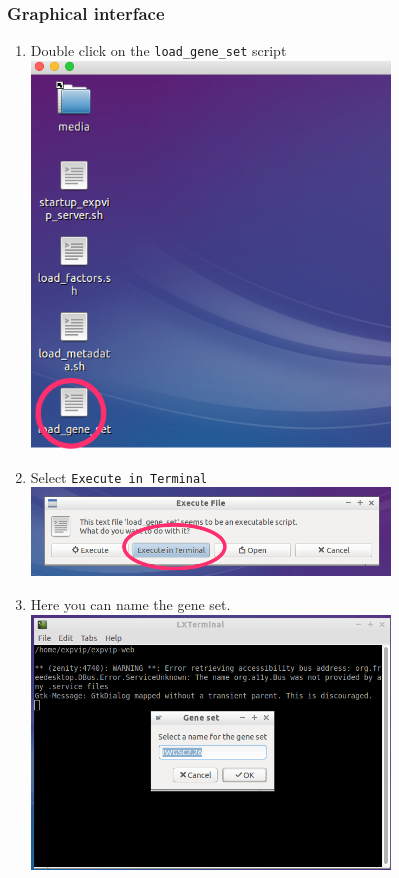 \subsubsection{Graphical interface}\label{graphical-interface}

\begin{enumerate}
\def\labelenumi{\arabic{enumi}.}
\itemsep1pt\parskip0pt
\item
  Double click on the \lstinline!load_gene_set! script
  \\ \includegraphics[width=0.75\textwidth]{expVIP/tutorial/images/LoadGeneSet01.png}
\item
  Select \lstinline!Execute in Terminal!
  \\ \includegraphics[width=0.75\textwidth]{expVIP/tutorial/images/LoadGeneSet02.png}
\item
  Here you can name the gene set.
  \\ \includegraphics[width=0.75\textwidth]{expVIP/tutorial/images/LoadGeneSet03.png}

\end{enumerate}
